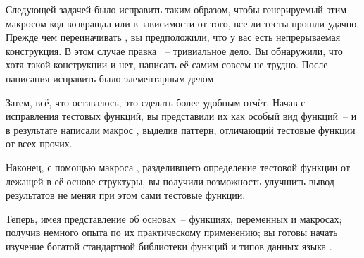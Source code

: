 Следующей задачей было исправить  таким образом, чтобы генерируемый этим
макросом код возвращал  или  в зависимости от того, все ли тесты прошли
удачно. Прежде чем переиначивать , вы предположили, что у вас есть
непрерываемая  конструкция. В этом случае правка ~-- тривиальное
дело. Вы обнаружили, что хотя такой конструкции и нет, написать её самим совсем не
трудно. После написания  исправить  было элементарным
делом.

Затем, всё, что оставалось, это сделать более удобным отчёт. Начав с исправления тестовых
функций, вы представили их как особый вид функций~-- и в результате написали макрос
, выделив паттерн, отличающий тестовые функции от всех прочих.

Наконец, с помощью макроса , разделившего определение тестовой функции от
лежащей в её основе структуры, вы получили возможность улучшить вывод результатов не меняя
при этом сами тестовые функции.

Теперь, имея представление об основах~-- функциях, переменных и макросах; получив немного
опыта по их практическому применению; вы готовы начать изучение богатой стандартной
библиотеки функций и типов данных языка .

